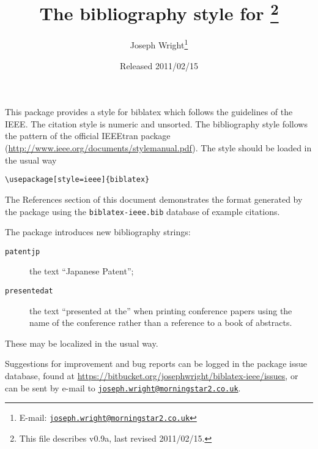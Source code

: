 \documentclass[a4paper]{ltxdoc}
\author{Joseph Wright\thanks{E-mail: 
  \href{mailto:joseph.wright@morningstar2.co.uk}
  {\texttt{joseph.wright@morningstar2.co.uk}}}}
\title{The \pkg{ieee} bibliography style for \pkg{biblatex}%
  \footnote{This file describes v0.9a, last revised 2011/02/15.}}
\date{Released 2011/02/15}
\providecommand*\pkg[1]{\textsf{#1}}
\begin{document}
\maketitle

This package provides a style for \pkg{biblatex} which follows the
guidelines of the IEEE. The citation style is numeric and unsorted. The
bibliography style follows the pattern of the official \pkg{IEEEtran}
package (\url{http://www.ieee.org/documents/stylemanual.pdf}). The style
should be loaded in the usual way
\begin{verbatim}
\usepackage[style=ieee]{biblatex}
\end{verbatim}
The References section of this document demonstrates the format 
generated by the package using the \texttt{biblatex-ieee.bib} database
of example citations.

The package introduces new bibliography strings:
\begin{description}
  \item[\texttt{patentjp}] the text \enquote{Japanese Patent};
  \item[\texttt{presentedat}] the text \enquote{presented at the} when 
    printing conference papers using the name of the conference rather 
    than a reference to a book of abstracts.
\end{description}
These may be localized in the usual way.

Suggestions for improvement and bug reports can be logged in the package
issue database, found at
\url{https://bitbucket.org/josephwright/biblatex-ieee/issues}, or can
be sent by e-mail to 
\href{mailto:joseph.wright@morningstar2.co.uk}
  {\texttt{joseph.wright@morningstar2.co.uk}}.

\nocite{*}

\printbibliography

\PrintChanges
\end{document}
